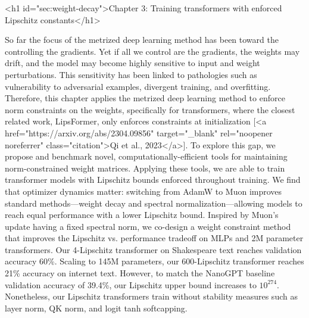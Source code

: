 <h1 id="sec:weight-decay">Chapter 3: Training transformers with enforced Lipschitz constants</h1>


So far the focus of the metrized deep learning method has been toward the controlling the gradients. Yet if all we control are the gradients, the weights may drift, and the model may become highly sensitive to input and weight perturbations. This sensitivity has been linked to pathologies such as vulnerability to adversarial examples, divergent training, and overfitting. Therefore, this chapter applies the metrized deep learning method to enforce norm constraints on the weights, specifically for transformers, where the closest related work, LipsFormer, only enforces constraints at initialization [<a href="https://arxiv.org/abs/2304.09856" target="_blank" rel="noopener noreferrer" class="citation">Qi et al., 2023</a>]. To explore this gap, we propose and benchmark novel, computationally-efficient tools for maintaining norm-constrained weight matrices. Applying these tools, we are able to train transformer models with Lipschitz bounds enforced throughout training. We find that optimizer dynamics matter: switching from AdamW to Muon improves standard methods---weight decay and spectral normalization---allowing models to reach equal performance with a lower Lipschitz bound. Inspired by Muon's update having a fixed spectral norm, we co-design a weight constraint method that improves the Lipschitz vs. performance tradeoff on MLPs and 2M parameter transformers. Our 4-Lipschitz transformer on Shakespeare text reaches validation accuracy 60\%. Scaling to 145M parameters, our 600-Lipschitz transformer reaches 21\% accuracy on internet text. However, to match the NanoGPT baseline validation accuracy of 39.4\%, our Lipschitz upper bound increases to $10^{274}$. Nonetheless, our Lipschitz transformers train without stability measures such as layer norm, QK norm, and logit tanh softcapping.

\vspace{1em}

